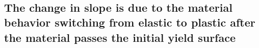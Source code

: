 \documentclass[11pt]{article}
\begin{document}
    \begin{center}
    \end{center}
    { \hspace*{\fill} \\}
    
    \hypertarget{the-change-in-slope-is-due-to-the-material-behavior-switching-from-elastic-to-plastic-after-the-material-passes-the-initial-yield-surface}{%
\subsection{The change in slope is due to the material behavior
switching from elastic to plastic after the material passes the initial
yield
surface}\label{the-change-in-slope-is-due-to-the-material-behavior-switching-from-elastic-to-plastic-after-the-material-passes-the-initial-yield-surface}}


    
    
    
    
\end{document}
